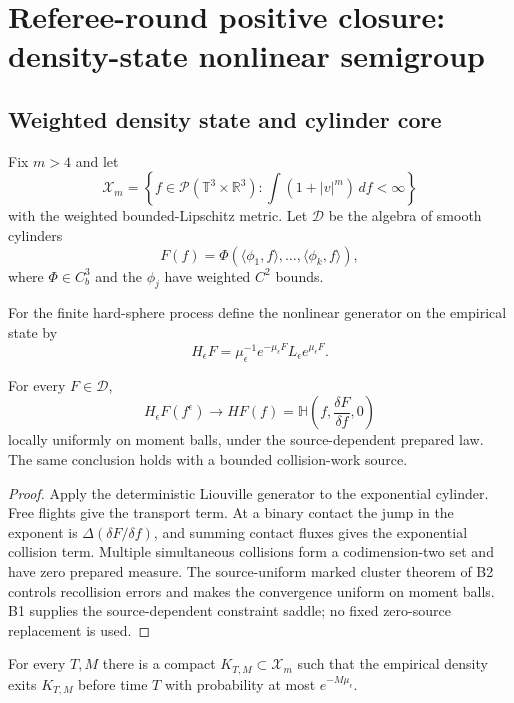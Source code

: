 \section{Referee-round positive closure: density-state nonlinear semigroup}
\label{sec:rr2-b4}

\subsection{Weighted density state and cylinder core}

Fix \(m>4\) and let
\[
 \mathcal X_m=\left\{
 f\in\mathcal P(\mathbb T^3\times\mathbb R^3):
 \int(1+|v|^m)\,df<\infty
 \right\}
\]
with the weighted bounded-Lipschitz metric.  Let \(\mathscr D\) be the algebra
of smooth cylinders
\[
 F(f)=\Phi(\langle\phi_1,f\rangle,\ldots,\langle\phi_k,f\rangle),
\]
where \(\Phi\in C_b^3\) and the \(\phi_j\) have weighted \(C^2\) bounds.

For the finite hard-sphere process define the nonlinear generator on the
empirical state by
\[
 H_\epsilon F
 =
 \mu_\epsilon^{-1}e^{-\mu_\epsilon F}
 L_\epsilon e^{\mu_\epsilon F}.
\]

\begin{theorem}
\label{thm:rr2-b4-generator}
For every \(F\in\mathscr D\),
\[
 H_\epsilon F(f^\epsilon)\longrightarrow
 H F(f)
 =
 \mathbb H\left(f,\frac{\delta F}{\delta f},0\right)
\]
locally uniformly on moment balls, under the source-dependent prepared law.
The same conclusion holds with a bounded collision-work source.
\end{theorem}

\begin{proof}
Apply the deterministic Liouville generator to the exponential cylinder.
Free flights give the transport term.  At a binary contact the jump in the
exponent is \(\Delta(\delta F/\delta f)\), and summing contact fluxes gives
the exponential collision term.  Multiple simultaneous collisions form a
codimension-two set and have zero prepared measure.  The source-uniform
marked cluster theorem of B2 controls recollision errors and makes the
convergence uniform on moment balls.  B1 supplies the source-dependent
constraint saddle; no fixed zero-source replacement is used.
\end{proof}

\begin{lemma}
\label{lem:rr2-b4-containment}
For every \(T,M\) there is a compact \(K_{T,M}\subset\mathcal X_m\) such
that the empirical density exits \(K_{T,M}\) before time \(T\) with
probability at most \(e^{-M\mu_\epsilon}\).
\end{lemma}

